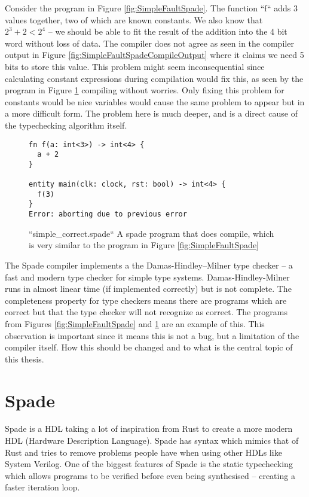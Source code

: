 Consider the program in Figure \ref{fig:SimpleFaultSpade}. The function ``f`` adds 3 values together, two of which are known constants. We also know that $2^3 + 2 < 2^4$ -- we should be able to fit the result of the addition into the 4 bit word without loss of data. The compiler does not agree as seen in the compiler output in Figure \ref{fig:SimpleFaultSpadeCompileOutput} where it claims we need 5 bits to store this value. This problem might seem inconsequential since calculating constant expressions during compilation would fix this, as seen by the program in Figure \ref{fig:SimpleCorrectSpade} compiling without worries. Only fixing this problem for constants would be nice variables would cause the same problem to appear but in a more difficult form. The problem here is much deeper, and is a direct cause of the typechecking algorithm itself.

\begin{figure}[h]
\begin{center}
\begin{verbatim}
fn f(a: int<3>) -> int<4> {
  a + 2
}

entity main(clk: clock, rst: bool) -> int<4> {
  f(3)
}
Error: aborting due to previous error
\end{verbatim}
\end{center}
\label{fig:SimpleCorrectSpade}
\caption{``simple\_correct.spade`` A spade program that does compile, which is very similar to the program in Figure \ref{fig:SimpleFaultSpade}}
\end{figure}

The Spade compiler implements a the Damas-Hindley–Milner type checker -- a fast and modern type checker for simple type systems. Damas-Hindley-Milner runs in almost linear time (if implemented correctly) but is not complete. The completeness property for type checkers means there are programs which are correct but that the type checker will not recognize as correct. The programs from Figures \ref{fig:SimpleFaultSpade} and \ref{fig:SimpleCorrectSpade} are an example of this. This observation is important since it means this is not a bug, but a limitation of the compiler itself. How this should be changed and to what is the central topic of this thesis.

\section{Spade}
Spade is a HDL taking a lot of inspiration from Rust to create a more modern HDL (Hardware Description Language). Spade has syntax which mimics that of Rust and tries to remove problems people have when using other HDLs like System Verilog. One of the biggest features of Spade is the static typechecking which allows programs to be verified before even being synthesised -- creating a faster iteration loop.
\cite{src:spadeSomething} \cite{src:spadeAnHDL}

